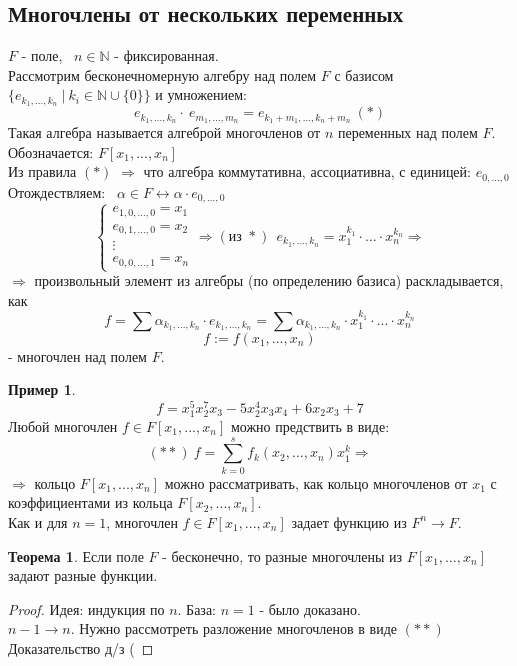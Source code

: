 \documentclass[a4paper, 12pt]{article}
\newcommand{\N}{\mathbb N}
\theoremstyle{definition}
\newtheorem*{theorem}{Теорема}
\newtheorem*{example1}{Пример}
\begin{document}
  \subsection{Многочлены от нескольких переменных}
  $F$ - поле, \ $n \in \N$ - фиксированная. \\
  Рассмотрим бесконечномерную алгебру над полем $F$ с базисом \\ $\{e_{k_1,...,k_n} \ | \ k_i \in \N \cup \{0\} \} $ и умножением:
  $$e_{k_1,...,k_n} \cdot \ e_{m_1,...,m_n} = e_{k_1 + m_1,...,k_n + m_n} \ (*)$$
  Такая алгебра называется алгеброй многочленов от $n$ переменных над полем $F$. \\
  Обозначается: $F[x_1,...,x_n]$\\
  Из правила $(*)$ $\Longrightarrow $ что алгебра коммутативна, ассоциативна, с единицей: $e_{0,...,0}$\\
  Отождествляем: \ $\alpha \in F \longleftrightarrow \alpha \cdot e_{0,...,0}$
  $$\begin{cases}
    e_{1,0,...,0} = x_1\\
    e_{0,1,...,0} = x_2\\
    \vdots\\
    e_{0,0,...,1} = x_n
  \end{cases} \Longrightarrow (\text{из } *) \ \ e_{k_1,...,k_n} = x_1^{k_1} \cdot ... \cdot x_n^{k_n} \Longrightarrow $$ 
  $\Longrightarrow $ произвольный элемент из алгебры (по определению базиса) раскладывается, как $$f = \sum \alpha_{k_1,...,k_n} \cdot e_{k_1,...,k_n} = \sum \alpha_{k_1,...,k_n} \cdot x_1^{k_1} \cdot ... \cdot x_n^{k_n}$$
  $$ f:= f(x_1,...,x_n)$$ 
  - многочлен над полем $F$.
  \begin{example1}
    $$f = x_1^5 x_2^7 x_3 - 5x_2^4x_3x_4 + 6x_2x_3 + 7$$
    Любой многочлен $f \in F[x_1,...,x_n]$ можно предствить в виде:
    $$(**) \ f = \sum \limits_{k=0}^sf_k(x_2,...,x_n)x_1^k \Longrightarrow $$
    $\Longrightarrow$ кольцо $F[x_1,...,x_n]$ можно рассматривать, как кольцо многочленов от $x_1$ с коэффициентами из кольца $F[x_2,...,x_n]$.\\
    Как и для $n=1$, многочлен $f \in F[x_1,...,x_n]$ задает функцию из $F^n \to F$.      
  \end{example1} 
  \begin{theorem}
    Если поле $F$ - бесконечно, то разные многочлены из $F[x_1,...,x_n]$ задают разные функции.
  \end{theorem}
  \begin{proof}
    Идея: индукция по $n$. База: $n=1$ - было доказано.\\
    $n-1 \to n$. Нужно рассмотреть разложение многочленов в виде $(**)$\\
    Доказательство д/з (   
  \end{proof}
\end{document}
